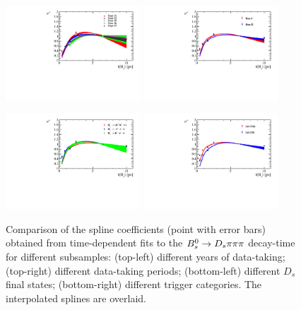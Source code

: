 \begin{figure}[h]
\centering
\includegraphics[height=!,width=0.45\textwidth]{figs/Acceptance/timeAcc_comparison_by_year_t1_adaptive_N4.pdf}
\includegraphics[height=!,width=0.45\textwidth]{figs/Acceptance/timeAcc_comparison_by_run_adaptive_N4.pdf}

\includegraphics[height=!,width=0.45\textwidth]{figs/Acceptance/timeAcc_comparison_by_DsFinalState_mod_adaptive_N4.pdf}
\includegraphics[height=!,width=0.45\textwidth]{figs/Acceptance/timeAcc_comparison_by_trigger_adaptive_N4.pdf}
\caption{Comparison of the spline coefficients (point with error bars) obtained from time-dependent fits to the ${{B}^0_{s}}\rightarrow{\ensuremath{{D}_{s}}}{\ensuremath{\pi}}{\ensuremath{\pi}}{\ensuremath{\pi}}$ decay-time for different subsamples:
(top-left) different years of data-taking; (top-right) different data-taking periods;
(bottom-left) different $D_s$ final states; (bottom-right) different trigger categories. 
The interpolated splines are overlaid.}
\label{fig:AccComp}
\end{figure}

